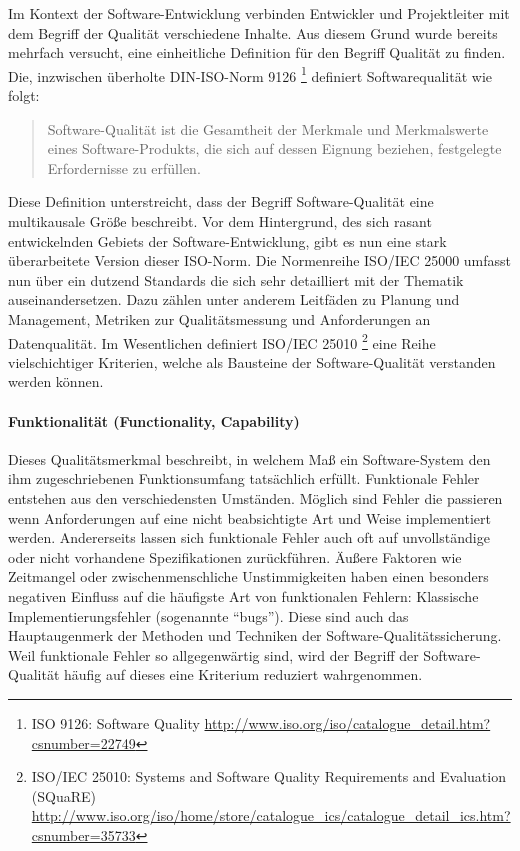Im Kontext der Software-Entwicklung verbinden Entwickler und Projektleiter mit dem Begriff der Qualität verschiedene Inhalte.\cite{hoffmann_software-qualitat_2013} Aus diesem Grund wurde bereits mehrfach versucht, eine einheitliche Definition für den Begriff Qualität zu finden. Die, inzwischen überholte DIN-ISO-Norm 9126 \footnote{ISO 9126: Software Quality \url{http://www.iso.org/iso/catalogue_detail.htm?csnumber=22749}} definiert Softwarequalität wie folgt:

\begin{quote}
Software-Qualität ist die Gesamtheit der Merkmale und Merkmalswerte eines Software-Produkts, die sich auf dessen Eignung beziehen, festgelegte Erfordernisse zu erfüllen.
\end{quote}

Diese Definition unterstreicht, dass der Begriff Software-Qualität eine multikausale Größe beschreibt.\cite{hoffmann_software-qualitat_2013} Vor dem Hintergrund, des sich rasant entwickelnden Gebiets der Software-Entwicklung, gibt es nun eine stark überarbeitete Version dieser ISO-Norm. Die Normenreihe ISO/IEC 25000 umfasst nun über ein dutzend Standards die sich sehr detailliert mit der Thematik auseinandersetzen. Dazu zählen unter anderem Leitfäden zu Planung und Management, Metriken zur Qualitätsmessung und Anforderungen an Datenqualität. Im Wesentlichen definiert ISO/IEC 25010 \footnote{ISO/IEC 25010: Systems and Software Quality Requirements and Evaluation (SQuaRE) \url{http://www.iso.org/iso/home/store/catalogue_ics/catalogue_detail_ics.htm?csnumber=35733}} eine Reihe vielschichtiger Kriterien, welche als Bausteine der Software-Qualität verstanden werden können.


\paragraph{Funktionalität (Functionality, Capability)} Dieses Qualitätsmerkmal beschreibt, in welchem Maß ein Software-System den ihm zugeschriebenen Funktionsumfang tatsächlich erfüllt. Funktionale Fehler entstehen aus den verschiedensten Umständen. Möglich sind Fehler die passieren wenn Anforderungen auf eine nicht beabsichtigte Art und Weise implementiert werden. Andererseits lassen sich funktionale Fehler auch oft auf unvollständige oder nicht vorhandene Spezifikationen zurückführen. Äußere Faktoren wie Zeitmangel oder zwischenmenschliche Unstimmigkeiten haben einen besonders negativen Einfluss auf die häufigste Art von funktionalen Fehlern: Klassische Implementierungsfehler (sogenannte ``bugs''). Diese sind auch das Hauptaugenmerk der Methoden und Techniken der Software-Qualitätssicherung. Weil funktionale Fehler so allgegenwärtig sind, wird der Begriff der Software-Qualität häufig auf dieses eine Kriterium reduziert wahrgenommen.

